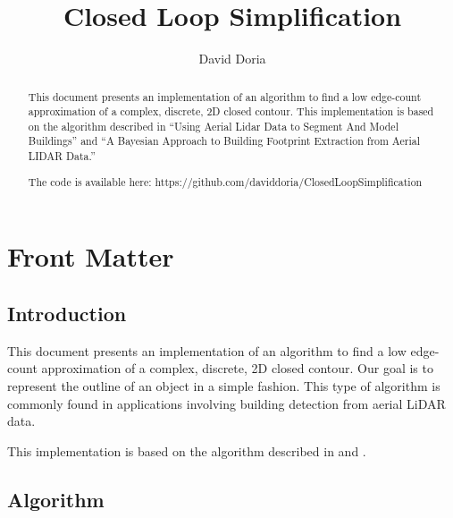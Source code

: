 \documentclass{InsightArticle}
\title{Closed Loop Simplification}
\author{David Doria}
\newcommand{\IJhandlerIDnumber}{3302}
\begin{document}
\IJhandlefooter{\IJhandlerIDnumber}


\ifpdf
\else
\fi


\maketitle


\ifhtml
\chapter*{Front Matter\label{front}}
\fi

\begin{abstract}
\noindent

This document presents an implementation of an algorithm to find a low edge-count approximation of a complex, discrete, 2D closed contour. This implementation is based on the algorithm described in ``Using Aerial Lidar Data to Segment And Model Buildings'' and ``A Bayesian Approach to Building Footprint Extraction from Aerial LIDAR Data.''

The code is available here:
https://github.com/daviddoria/ClosedLoopSimplification

\end{abstract}

\IJhandlenote{\IJhandlerIDnumber}

\tableofcontents
\section{Introduction}
This document presents an implementation of an algorithm to find a low edge-count approximation of a complex, discrete, 2D closed contour. Our goal is to represent the outline of an object in a simple fashion. This type of algorithm is commonly found in applications involving building detection from aerial LiDAR data.

This implementation is based on the algorithm described in \cite{WangThesis} and \cite{WangPaper}.

\section{Algorithm}
\label{sec:Algorithm}
\end{document}
